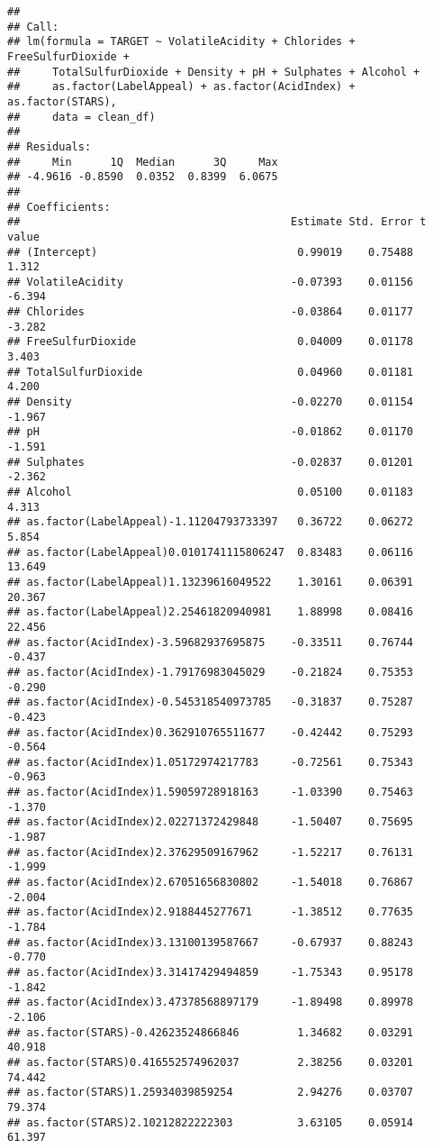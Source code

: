 \documentclass[
]{article}
\begin{document}
\begin{verbatim}
## 
## Call:
## lm(formula = TARGET ~ VolatileAcidity + Chlorides + FreeSulfurDioxide + 
##     TotalSulfurDioxide + Density + pH + Sulphates + Alcohol + 
##     as.factor(LabelAppeal) + as.factor(AcidIndex) + as.factor(STARS), 
##     data = clean_df)
## 
## Residuals:
##     Min      1Q  Median      3Q     Max 
## -4.9616 -0.8590  0.0352  0.8399  6.0675 
## 
## Coefficients:
##                                          Estimate Std. Error t value
## (Intercept)                               0.99019    0.75488   1.312
## VolatileAcidity                          -0.07393    0.01156  -6.394
## Chlorides                                -0.03864    0.01177  -3.282
## FreeSulfurDioxide                         0.04009    0.01178   3.403
## TotalSulfurDioxide                        0.04960    0.01181   4.200
## Density                                  -0.02270    0.01154  -1.967
## pH                                       -0.01862    0.01170  -1.591
## Sulphates                                -0.02837    0.01201  -2.362
## Alcohol                                   0.05100    0.01183   4.313
## as.factor(LabelAppeal)-1.11204793733397   0.36722    0.06272   5.854
## as.factor(LabelAppeal)0.0101741115806247  0.83483    0.06116  13.649
## as.factor(LabelAppeal)1.13239616049522    1.30161    0.06391  20.367
## as.factor(LabelAppeal)2.25461820940981    1.88998    0.08416  22.456
## as.factor(AcidIndex)-3.59682937695875    -0.33511    0.76744  -0.437
## as.factor(AcidIndex)-1.79176983045029    -0.21824    0.75353  -0.290
## as.factor(AcidIndex)-0.545318540973785   -0.31837    0.75287  -0.423
## as.factor(AcidIndex)0.362910765511677    -0.42442    0.75293  -0.564
## as.factor(AcidIndex)1.05172974217783     -0.72561    0.75343  -0.963
## as.factor(AcidIndex)1.59059728918163     -1.03390    0.75463  -1.370
## as.factor(AcidIndex)2.02271372429848     -1.50407    0.75695  -1.987
## as.factor(AcidIndex)2.37629509167962     -1.52217    0.76131  -1.999
## as.factor(AcidIndex)2.67051656830802     -1.54018    0.76867  -2.004
## as.factor(AcidIndex)2.9188445277671      -1.38512    0.77635  -1.784
## as.factor(AcidIndex)3.13100139587667     -0.67937    0.88243  -0.770
## as.factor(AcidIndex)3.31417429494859     -1.75343    0.95178  -1.842
## as.factor(AcidIndex)3.47378568897179     -1.89498    0.89978  -2.106
## as.factor(STARS)-0.42623524866846         1.34682    0.03291  40.918
## as.factor(STARS)0.416552574962037         2.38256    0.03201  74.442
## as.factor(STARS)1.25934039859254          2.94276    0.03707  79.374
## as.factor(STARS)2.10212822222303          3.63105    0.05914  61.397

\end{verbatim}
\end{document}
